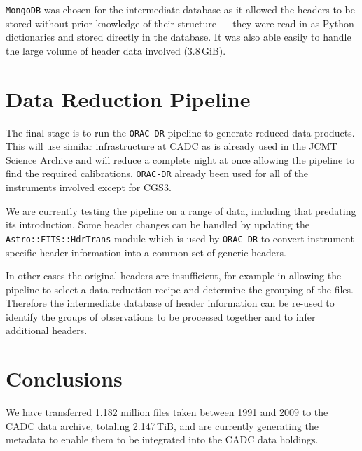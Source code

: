 \documentclass[11pt,twoside]{article}
\begin{document}
\texttt{MongoDB} was chosen for the intermediate database
as it allowed the
headers to be stored without prior knowledge of their structure
--- they were read in as Python dictionaries and
stored directly in the database.
It was also able easily to handle the large
volume of header data involved (3.8\,GiB).

\section{Data Reduction Pipeline}

The final stage is to run the \texttt{ORAC-DR} pipeline
\citep{1999ASPC..172...11E,2008AN....329..295C}
to generate reduced
data products.
This will use similar infrastructure at CADC as is already
used in the JCMT Science Archive
\citep{2011ASPC..442..203E}
and will reduce a complete night at once allowing
the pipeline to find the required calibrations.
\texttt{ORAC-DR} already been used for all of the instruments
involved except for CGS3.

We are currently testing the pipeline on a range of data,
including that predating its introduction.
Some header changes can be handled by updating the
\texttt{Astro::FITS::HdrTrans} module
\citep[section 2.2]{2008AN....329..295C}
which is used by \texttt{ORAC-DR} to convert
instrument specific header information into
a common set of generic headers.

In other cases the original headers are insufficient,
for example in allowing the pipeline to
select a data reduction recipe and determine the
grouping of the files.
Therefore the intermediate database of header information
can be re-used to identify
the groups of observations to be processed together and to infer
additional headers.


\section{Conclusions}

We have transferred 1.182 million files taken between 1991 and 2009 to
the CADC data archive, totaling 2.147\,TiB, and are currently generating
the metadata to enable them to be integrated into the CADC data
holdings.


\end{document}
